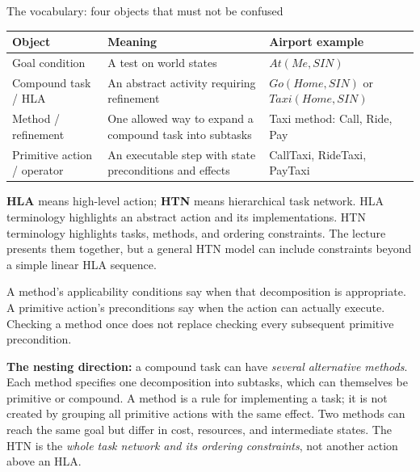 \documentclass[10pt,a4paper]{article}
\begin{document}
\begin{card}{The vocabulary: four objects that must not be confused}
\small
\begin{tabularx}{\linewidth}{@{}P{2.5cm}Y Y@{}}
\toprule Object & Meaning & Airport example \\\midrule
Goal condition & A test on world states & $At(Me,SIN)$ \\
Compound task / HLA & An abstract activity requiring refinement & $Go(Home,SIN)$ or $Taxi(Home,SIN)$ \\
Method / refinement & One allowed way to expand a compound task into subtasks & Taxi method: Call, Ride, Pay \\
Primitive action / operator & An executable step with state preconditions and effects & CallTaxi, RideTaxi, PayTaxi \\\bottomrule
\end{tabularx}
\normalsize
\textbf{HLA} means high-level action; \textbf{HTN} means hierarchical task network. HLA terminology highlights an abstract action and its implementations. HTN terminology highlights tasks, methods, and ordering constraints. The lecture presents them together, but a general HTN model can include constraints beyond a simple linear HLA sequence.

A method's applicability conditions say when that decomposition is appropriate. A primitive action's preconditions say when the action can actually execute. Checking a method once does not replace checking every subsequent primitive precondition.

\textbf{The nesting direction:} a compound task can have \emph{several alternative methods}. Each method specifies one decomposition into subtasks, which can themselves be primitive or compound. A method is a rule for implementing a task; it is not created by grouping all primitive actions with the same effect. Two methods can reach the same goal but differ in cost, resources, and intermediate states. The HTN is the \emph{whole task network and its ordering constraints}, not another action above an HLA.
\end{card}
\end{document}
